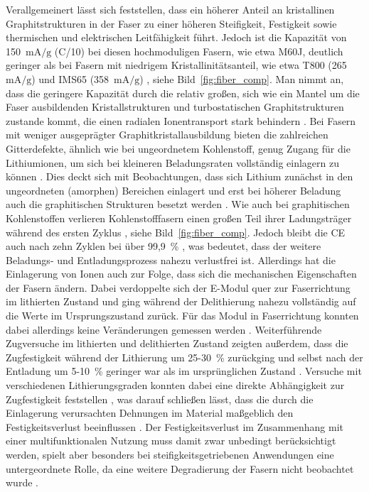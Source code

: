 Verallgemeinert lässt sich feststellen, dass ein höherer Anteil an kristallinen Graphitstrukturen in der Faser zu einer höheren Steifigkeit, Festigkeit sowie thermischen und elektrischen Leitfähigkeit führt. Jedoch ist die Kapazität von 150~$\si{\mA\per\g}$ (C/10) bei diesen hochmoduligen Fasern, wie etwa M60J, deutlich geringer als bei Fasern mit niedrigem Kristallinitätsanteil, wie etwa T800 (265~$\si{\mA\per\g}$) und IMS65 (358~$\si{\mA\per\g}$) \cite{Fredi2018}, siehe Bild~\ref{fig:fiber_comp}. Man nimmt an, dass die geringere Kapazität durch die relativ großen, sich wie ein Mantel um die Faser ausbildenden Kristallstrukturen und turbostatischen Graphitstrukturen zustande kommt, die einen radialen Ionentransport stark behindern \cite{Zenkert2024}. Bei Fasern mit weniger ausgeprägter Graphitkristallausbildung bieten die zahlreichen Gitterdefekte, ähnlich wie bei ungeordnetem Kohlenstoff, genug Zugang für die Lithiumionen, um sich bei kleineren Beladungsraten vollständig einlagern zu können \cite{Fredi2018}. Dies deckt sich mit Beobachtungen, dass sich Lithium zunächst in den ungeordneten (amorphen) Bereichen einlagert und erst bei höherer Beladung auch die graphitischen Strukturen besetzt werden \cite{Fang2022}. Wie auch bei graphitischen Kohlenstoffen verlieren Kohlenstofffasern einen großen Teil ihrer Ladungsträger während des ersten Zyklus \cite{Jacques2013}, siehe Bild~\ref{fig:fiber_comp}. Jedoch bleibt die CE auch nach zehn Zyklen bei über 99,9~\% \cite{Hagberg2016}, was bedeutet, dass der weitere Beladungs- und Entladungsprozess nahezu verlustfrei ist. Allerdings hat die Einlagerung von Ionen auch zur Folge, dass sich die mechanischen Eigenschaften der Fasern ändern. Dabei verdoppelte sich der E-Modul quer zur Faserrichtung im lithierten Zustand und ging während der Delithierung nahezu vollständig auf die Werte im Ursprungszustand zurück. Für das Modul in Faserrichtung konnten dabei allerdings keine Veränderungen gemessen werden \cite{Duan2021}. Weiterführende Zugversuche im lithierten und delithierten Zustand zeigten außerdem, dass die Zugfestigkeit während der Lithierung um 25-30~\% zurückging und selbst nach der Entladung um 5-10~\% geringer war als im ursprünglichen Zustand \cite{Jacques2012}. Versuche mit verschiedenen Lithierungsgraden konnten dabei eine direkte Abhängigkeit zur Zugfestigkeit feststellen \cite{Jacques2014}, was darauf schließen lässt, dass die durch die Einlagerung verursachten Dehnungen im Material maßgeblich den Festigkeitsverlust beeinflussen \cite{Zenkert2024}. Der Festigkeitsverlust im Zusammenhang mit einer multifunktionalen Nutzung muss damit zwar unbedingt berücksichtigt werden, spielt aber besonders bei steifigkeitsgetriebenen Anwendungen eine untergeordnete Rolle, da eine weitere Degradierung der Fasern nicht beobachtet wurde \cite{Zenkert2024}.


